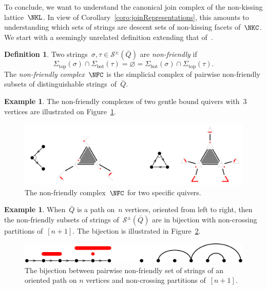 \documentclass{memo-l}
\theoremstyle{definition}
\newtheorem{definition}[theorem]{Definition}
\newtheorem{example}[theorem]{Example}
\newcommand{\fref}[1]{Figure~\ref{#1}} %
\newcommand{\darkblue}{\color{darkblue}} %
\newcommand{\defn}[1]{\textsl{\darkblue #1}} %
\newcommand{\strings}{\mathcal{S}} %
\renewcommand{\top}{\mathrm{top}} %
\newcommand{\bottom}{\mathrm{bot}} %
\begin{document}
To conclude, we want to understand the canonical join complex of the non-kissing lattice~$\NKL$.
In view of Corollary~\ref{coro:joinRepresentations}, this amounts to understanding which sets of strings are descent sets of non-kissing facets of~$\NKC$.
We start with a seemingly unrelated definition extending that of~\cite[Sect.~3.4]{GarverMcConville-grid}.

\begin{definition}\label{def: friendly}
Two strings~$\sigma, \tau \in \strings^\pm(\bar Q)$ are \defn{non-friendly} if
\[
\Sigma_\top(\sigma) \cap \Sigma_\bottom(\tau) = \varnothing = \Sigma_\bottom(\sigma) \cap \Sigma_\top(\tau).
\]
The \defn{non-friendly complex}~$\NFC$ is the simplicial complex of pairwise non-friendly subsets of distinguishable strings~of~$\bar Q$.
\end{definition}

\begin{example}
The non-friendly complexes of two gentle bound quivers with~$3$ vertices are illustrated on \fref{fig:exmNFC}.
%
\begin{figure}[t]
	\capstart
	\centerline{\includegraphics[scale=.4]{exmNFC}}
	\caption{The non-friendly complex~$\NFC$ for two specific quivers.}
	\label{fig:exmNFC}
\end{figure}
\end{example}

\begin{example}
When~$\bar Q$ is a path on~$n$ vertices, oriented from left to right, then the non-friendly subsets of strings of~$\strings^\pm(\bar Q)$ are in bijection with non-crossing partitions of~$[n+1]$.
The bijection is illustrated in \fref{fig:exmNCP}.
%
\begin{figure}[t]
	\capstart
	\centerline{\includegraphics[scale=.35]{exmNCP}}
	\caption{The bijection between pairwise non-friendly set of strings of an oriented path on $n$ vertices and non-crossing partitions of~$[n+1]$.}
	\label{fig:exmNCP}
\end{figure}
\end{example}
\end{document}

